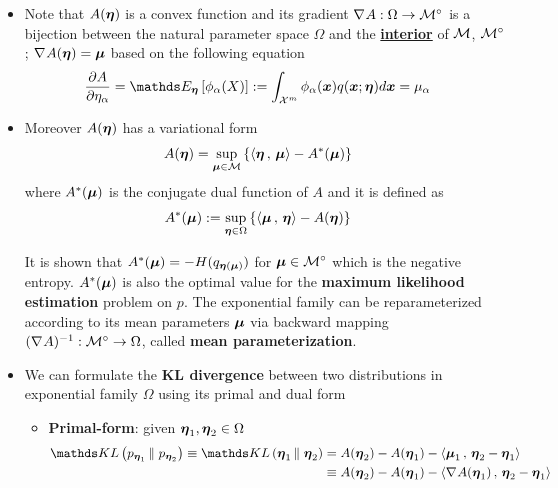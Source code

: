 \documentclass[11pt]{article}
\begin{document}
\begin{itemize}
\item Note that $A(\boldsymbol{\eta})$ is a convex function and its gradient $\nabla_{}{A}: \Omega \rightarrow {\mathcal M}^{\circ}$ is a bijection between the natural parameter space $\Omega$ and the \underline{\textbf{interior}} of ${\mathcal M}$,  ${\mathcal M}^{\circ}$; $\nabla_{}{A}(\boldsymbol{\eta}) = \boldsymbol{\mu}$ based on the following equation 
\begin{align}
\partdiff{A}{\eta_{\alpha}} &= \E{\mb{\eta}}{\phi_{\alpha}(X)} := \int_{\cX^{m}}\phi_{\alpha}(\mb{x}) q(\mb{x}; \mb{\eta}) d\mb{x} = \mu_{\alpha} \label{eqn: partition_first_order}
\end{align}

\item Moreover $A(\boldsymbol{\eta})$ has a variational form 
\begin{align}
A(\boldsymbol{\eta}) &=  \sup_{\boldsymbol{\mu} \in {\mathcal M}}\left\{ \left\langle \boldsymbol{\eta}\,,\, \boldsymbol{\mu} \right\rangle - A^{*}(\boldsymbol{\mu})\right\} \label{eqn: log_partition_variational_form}
\end{align}
where $A^{*}(\boldsymbol{\mu})$ is the conjugate dual function of $A$ and it is defined as
\begin{align}
A^{*}(\boldsymbol{\mu}) &:= \sup_{\boldsymbol{\eta} \in \Omega} \left\{\left\langle \boldsymbol{\mu}\,,\, \boldsymbol{\eta} \right\rangle - A(\boldsymbol{\eta})\right\} \label{eqn: conjugate_dual_partition}
\end{align}

It is shown that $A^{*}(\boldsymbol{\mu})  = -H(q_{\boldsymbol{\eta}(\boldsymbol{\mu})})$ for $\boldsymbol{\mu} \in  {\mathcal M}^{\circ}$ which is the negative entropy. $A^{*}(\boldsymbol{\mu})$ is also the optimal value for the \textbf{maximum likelihood estimation} problem on $p$. The exponential family can be reparameterized according to its mean parameters $\boldsymbol{\mu}$ via backward mapping $(\nabla_{}{A})^{-1}: {\mathcal M}^{\circ} \rightarrow  \Omega$, called \textbf{mean parameterization}.

\item We can formulate the \textbf{KL divergence} between two distributions in exponential family $\Omega$ using its primal and dual form
\begin{itemize}
\item \textbf{Primal-form}: given $\boldsymbol{\eta}_1, \boldsymbol{\eta}_2 \in \Omega$
\begin{align}
\kl{p_{\mb{\eta}_1}}{p_{\mb{\eta}_2}} \equiv  \kl{\mb{\eta}_1}{\mb{\eta}_2}
&=  A(\mb{\eta}_2) - A(\mb{\eta}_1) -  \inn{\mb{\mu}_{1}}{\mb{\eta}_2 - \mb{\eta}_1}  \label{eqn: kl_primal}\\
&\equiv  A(\mb{\eta}_2) - A(\mb{\eta}_1) -  \inn{\grad{}{A}(\mb{\eta}_1)}{\mb{\eta}_2 - \mb{\eta}_1}  \nonumber
\end{align}


\end{itemize}
\end{itemize}
\end{document}
